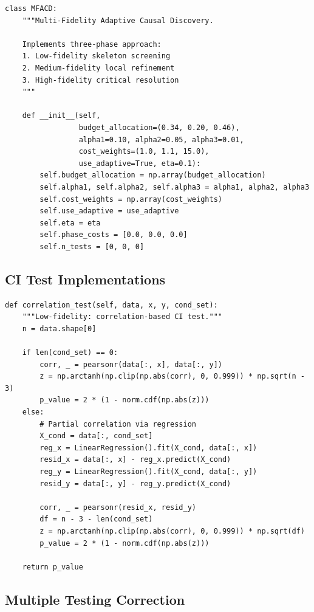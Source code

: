 \documentclass{article}
\begin{document}
\begin{lstlisting}[caption={Core MF-ACD class initialization.}, label={lst:mf_acd_class}]
class MFACD:
    """Multi-Fidelity Adaptive Causal Discovery.
    
    Implements three-phase approach:
    1. Low-fidelity skeleton screening
    2. Medium-fidelity local refinement  
    3. High-fidelity critical resolution
    """
    
    def __init__(self, 
                 budget_allocation=(0.34, 0.20, 0.46),
                 alpha1=0.10, alpha2=0.05, alpha3=0.01,
                 cost_weights=(1.0, 1.1, 15.0),
                 use_adaptive=True, eta=0.1):
        self.budget_allocation = np.array(budget_allocation)
        self.alpha1, self.alpha2, self.alpha3 = alpha1, alpha2, alpha3
        self.cost_weights = np.array(cost_weights)
        self.use_adaptive = use_adaptive
        self.eta = eta
        self.phase_costs = [0.0, 0.0, 0.0]
        self.n_tests = [0, 0, 0]
\end{lstlisting}

\subsection{CI Test Implementations}

\begin{lstlisting}[caption={Low-fidelity correlation-based CI test.}, label={lst:correlation_test}]
def correlation_test(self, data, x, y, cond_set):
    """Low-fidelity: correlation-based CI test."""
    n = data.shape[0]
    
    if len(cond_set) == 0:
        corr, _ = pearsonr(data[:, x], data[:, y])
        z = np.arctanh(np.clip(np.abs(corr), 0, 0.999)) * np.sqrt(n - 3)
        p_value = 2 * (1 - norm.cdf(np.abs(z)))
    else:
        # Partial correlation via regression
        X_cond = data[:, cond_set]
        reg_x = LinearRegression().fit(X_cond, data[:, x])
        resid_x = data[:, x] - reg_x.predict(X_cond)
        reg_y = LinearRegression().fit(X_cond, data[:, y])
        resid_y = data[:, y] - reg_y.predict(X_cond)
        
        corr, _ = pearsonr(resid_x, resid_y)
        df = n - 3 - len(cond_set)
        z = np.arctanh(np.clip(np.abs(corr), 0, 0.999)) * np.sqrt(df)
        p_value = 2 * (1 - norm.cdf(np.abs(z)))
    
    return p_value
\end{lstlisting}

\subsection{Multiple Testing Correction}
\end{document}
